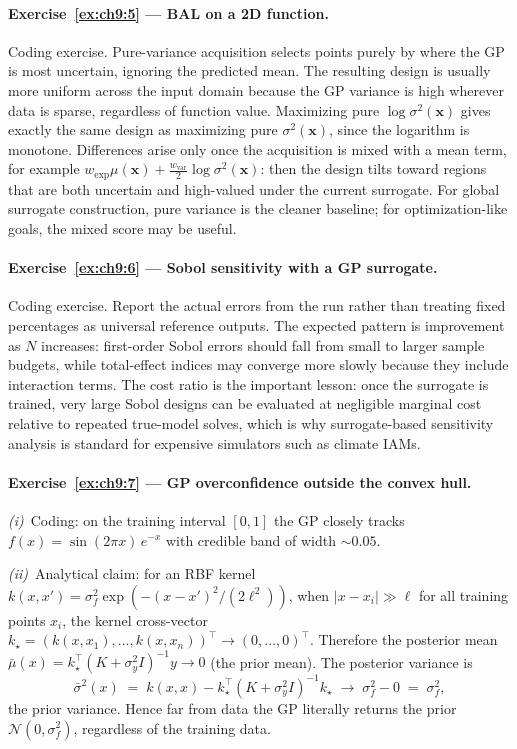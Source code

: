 \documentclass[11pt,a4paper]{report}
\newcommand{\x}{\bm{x}}
\begin{document}
\paragraph{Exercise~\ref{ex:ch9:5} --- BAL on a 2D function.}
Coding exercise.  Pure-variance acquisition selects points purely by where the GP is most uncertain, ignoring the predicted mean.  The resulting design is usually more uniform across the input domain because the GP variance is high wherever data is sparse, regardless of function value.  Maximizing pure $\log\sigma^2(\x)$ gives exactly the same design as maximizing pure $\sigma^2(\x)$, since the logarithm is monotone.  Differences arise only once the acquisition is mixed with a mean term, for example $w_{\mathrm{exp}}\mu(\x)+\tfrac{w_{\mathrm{var}}}{2}\log\sigma^2(\x)$: then the design tilts toward regions that are both uncertain and high-valued under the current surrogate.  For global surrogate construction, pure variance is the cleaner baseline; for optimization-like goals, the mixed score may be useful.

\paragraph{Exercise~\ref{ex:ch9:6} --- Sobol sensitivity with a GP surrogate.}
Coding exercise.  Report the actual errors from the run rather than treating fixed percentages as universal reference outputs.  The expected pattern is improvement as $N$ increases: first-order Sobol errors should fall from small to larger sample budgets, while total-effect indices may converge more slowly because they include interaction terms.  The cost ratio is the important lesson: once the surrogate is trained, very large Sobol designs can be evaluated at negligible marginal cost relative to repeated true-model solves, which is why surrogate-based sensitivity analysis is standard for expensive simulators such as climate IAMs.

\paragraph{Exercise~\ref{ex:ch9:7} --- GP overconfidence outside the convex hull.}
\emph{(i)}~Coding: on the training interval $[0,1]$ the GP closely tracks $f(x) = \sin(2\pi x)\,e^{-x}$ with credible band of width $\sim 0.05$.

\emph{(ii)}~Analytical claim: for an RBF kernel $k(x, x') = \sigma_f^2 \exp(-(x-x')^2 / (2\ell^2))$, when $|x - x_i| \gg \ell$ for all training points $x_i$, the kernel cross-vector $k_\star = (k(x, x_1), \ldots, k(x, x_n))^\top \to (0, \ldots, 0)^\top$.  Therefore the posterior mean $\bar\mu(x) = k_\star^\top (K + \sigma_y^2 I)^{-1} y \to 0$ (the prior mean).  The posterior variance is
\[
   \bar\sigma^2(x) \;=\; k(x,x) - k_\star^\top (K+\sigma_y^2 I)^{-1} k_\star \;\to\; \sigma_f^2 - 0 \;=\; \sigma_f^2,
\]
the prior variance.  Hence far from data the GP literally returns the prior $\mathcal{N}(0, \sigma_f^2)$, regardless of the training data.
\end{document}
